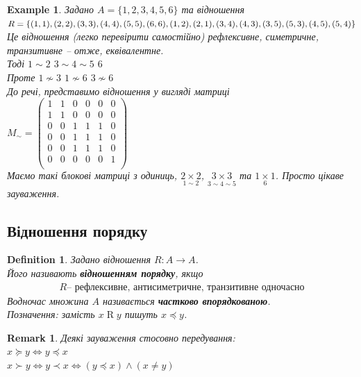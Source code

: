 \documentclass[a4paper, 14pt]{extarticle}
\theoremstyle{theoremdd}
\theoremstyle{theoremdd}
\newtheorem{definition}[theorem]{Definition}
\theoremstyle{theoremdd}
\theoremstyle{theoremdd}
\theoremstyle{theoremdd}
\newtheorem{example}[theorem]{Example}
\theoremstyle{theoremdd}
\theoremstyle{theoremdd}
\theoremstyle{theoremdd}
\theoremstyle{theoremdd}
\theoremstyle{theoremdd}
\theoremstyle{theoremdd}
\newtheorem{remark}[theorem]{Remark}
\theoremstyle{theoremdd}
\theoremstyle{theoremdd}
\theoremstyle{theoremdd}
\theoremstyle{theoremdd}
\begin{document}
\begin{example}
Задано $A = \{1,2,3,4,5,6\}$ та відношення\\
$R = \{(1,1),(2,2),(3,3),(4,4),(5,5),(6,6),(1,2),(2,1),(3,4),(4,3),(3,5), \\ (5,3),(4,5),(5,4)\}$\\
Це відношення (легко перевірити самостійно) рефлексивне, симетричне, транзитивне -- отже, еквівалентне.\\
Тоді $1 \sim 2$ \hspace{0.5cm} $3 \sim 4 \sim 5$ \hspace{0.5cm} $6$\\
Проте $1 \not\sim 3$ \hspace{0.5cm} $1 \not\sim 6$ \hspace{0.5cm} $3 \not\sim 6$
\bigskip \\
До речі, представимо відношення у вигляді матриці\\
$M_{\sim} = \begin{pmatrix}
1 & 1 & 0 & 0 & 0 & 0 \\
1 & 1 & 0 & 0 & 0 & 0 \\
0 & 0 & 1 & 1 & 1 & 0 \\
0 & 0 & 1 & 1 & 1 & 0 \\
0 & 0 & 1 & 1 & 1 & 0 \\
0 & 0 & 0 & 0 & 0 & 1 \\
\end{pmatrix}$\\
Маємо такі блокові матриці з одиниць, $\underset{1 \sim 2}{2 \times 2}$, $\underset{3 \sim 4 \sim 5}{3 \times 3}$ та $\underset{6}{1 \times 1}$. Просто цікаве зауваження.
\end{example}

\subsection{Відношення порядку}
\begin{definition}
Задано відношення $R: A \to A$.\\
Його називають \textbf{відношенням порядку}, якщо
\begin{align*}
R \text{-- рефлексивне, антисиметричне, транзитивне одночасно}
\end{align*}
Водночас множина $A$ називається \textbf{частково впорядкованою}.\\
Позначення: замість $x  \mathrel{R} y$ пишуть $x \preceq y$.
\end{definition}

\begin{remark}
Деякі зауваження стосовно передування:\\
$x \succeq  y \iff y \preceq x$\\
$x \succ y \iff y \prec x \iff (y \preceq x) \wedge (x \neq y)$
\end{remark}
\end{document}
